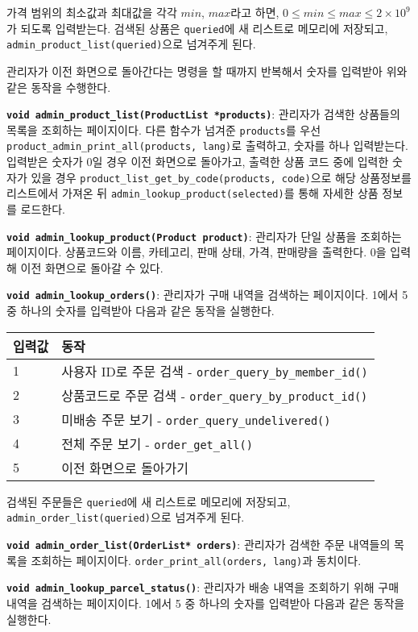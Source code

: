 \documentclass[runningheads]{llncs}
\begin{document}
가격 범위의 최소값과 최대값을 각각 $min$, $max$라고 하면, $0 \leq min \leq max \leq 2 \times {10}^{9}$가 되도록 입력받는다. 검색된 상품은 \texttt{queried}에 새 리스트로 메모리에 저장되고, \texttt{admin_product_list(queried)}으로 넘겨주게 된다.

관리자가 이전 화면으로 돌아간다는 명령을 할 때까지 반복해서 숫자를 입력받아 위와 같은 동작을 수행한다.

\textbf{\texttt{void admin_product_list(ProductList *products)}}: 관리자가 검색한 상품들의 목록을 조회하는 페이지이다. 다른 함수가 넘겨준 \texttt{products}를 우선 \texttt{product_admin_print_all(products, lang)}로 출력하고, 숫자를 하나 입력받는다. 입력받은 숫자가 0일 경우 이전 화면으로 돌아가고, 출력한 상품 코드 중에 입력한 숫자가 있을 경우 \texttt{product_list_get_by_code(products, code)}으로 해당 상품정보를 리스트에서 가져온 뒤 \texttt{admin_lookup_product(selected)}를 통해 자세한 상품 정보를 로드한다.

\textbf{\texttt{void admin_lookup_product(Product product)}}: 관리자가 단일 상품을 조회하는 페이지이다. 상품코드와 이름, 카테고리, 판매 상태, 가격, 판매량을 출력한다. 0을 입력해 이전 화면으로 돌아갈 수 있다.

\textbf{\texttt{void admin_lookup_orders()}}: 관리자가 구매 내역을 검색하는 페이지이다. 1에서 5 중 하나의 숫자를 입력받아 다음과 같은 동작을 실행한다.

\begin{tabularx}{\textwidth}{l|X}
	\hline
		입력값	& 동작 \\
	\hline
		1 & 사용자 ID로 주문 검색 - \texttt{order_query_by_member_id()} \\
		2 & 상품코드로 주문 검색 - \texttt{order_query_by_product_id()} \\
		3 & 미배송 주문 보기 - \texttt{order_query_undelivered()} \\
		4 & 전체 주문 보기 - \texttt{order_get_all()} \\
		5 & 이전 화면으로 돌아가기 \\
	\hline
\end{tabularx}

검색된 주문들은 \texttt{queried}에 새 리스트로 메모리에 저장되고, \texttt{admin_order_list(queried)}으로 넘겨주게 된다.

\textbf{\texttt{void admin_order_list(OrderList* orders)}}: 관리자가 검색한 주문 내역들의 목록을 조회하는 페이지이다. \texttt{order_print_all(orders, lang)}과 동치이다.

\textbf{\texttt{void admin_lookup_parcel_status()}}: 관리자가 배송 내역을 조회하기 위해 구매 내역을 검색하는 페이지이다. 1에서 5 중 하나의 숫자를 입력받아 다음과 같은 동작을 실행한다.
\end{document}
